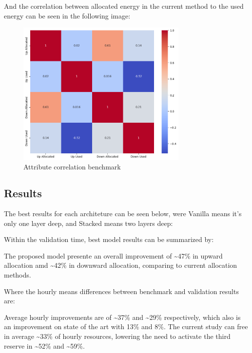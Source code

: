 And the correlation between allocated energy in the current method to the used energy can be seen in the following image:
\begin{figure}[H]
    \centering
    \includegraphics[width=0.75\textwidth]{plots/correlation_heatmap_benchmark.png}
    \caption{Attribute correlation benchmark}
    \label{fig:Attribute_correlation_benchmark}
  \end{figure}

  

\subsection{Results}

The best results for each architeture can be seen below, were Vanilla means it's only one layer deep, and Stacked means two layers deep:



Within the validation time, best model results can be summarized by:




The proposed model presente an overall improvement of \textasciitilde47\% in upward allocation amd \textasciitilde42\% in downward allocation, comparing to current allocation methods.\par

Where the hourly means differences between benchmark and validation results are:



Average hourly improvements are of \textasciitilde37\% and \textasciitilde29\% respectively, which also is an improvement on state of the art \cite{Algarvio2024} with 13\% and 8\%.
The current study can free in average \textasciitilde33\% of hourly resources, lowering the need to activate the third reserve in \textasciitilde52\% and \textasciitilde59\%.\par



